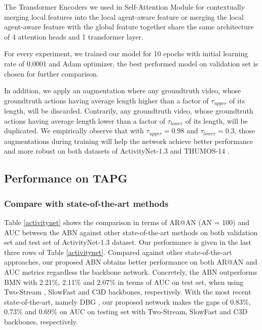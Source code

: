 \documentclass{ieeeaccess}
\begin{document}
The Transformer Encoders we used in Self-Attention Module for contextually merging local features into the local agent-aware feature or merging the local agent-aware feature with the global feature together share the same architecture of 4 attention heads and 1 transformer layer.

For every experiment, we trained our model for 10 epochs with initial learning rate of 0.0001 and Adam optimizer, the best performed model on validation set is chosen for further comparison.

In addition, we apply an augmentation where any groundtruth video, whose groundtruth actions having average length higher than a factor of $\tau_{upper}$ of its length, will be discarded. Contrarily, any groundtruth video, whose groundtruth actions having average length lower than a factor of $\tau_{lower}$ of its length, will be duplicated. We empirically observe that with $\tau_{upper}=0.98$ and $\tau_{lower}=0.3$, those augmentations during training will help the network achieve better performance and more robust on both datasets of ActivityNet-1.3 \cite{caba2015activitynet} and THUMOS-14 \cite{THUMOS14}.



\subsection{Performance on TAPG}
\subsubsection{Compare with state-of-the-art methods}

Table \ref{activitynet} shows the comparison in terms of AR@AN (AN = 100) and AUC between the ABN against other state-of-the-art methods on both validation set and test set of ActivityNet-1.3 \cite{caba2015activitynet} dataset. Our performance is given in the last three rows of Table \ref{activitynet}. Compared against other state-of-the-art approaches, our proposed ABN obtains better performance on both AR@AN and AUC metrics regardless the backbone network. Concretely, the ABN outperforms BMN with 2.21\%, 2.11\% and 2.07\% in terms of AUC on test set, when using Two-Stream \cite{2_stream_2}, SlowFast \cite{SlowFast} and C3D \cite{C3D_3} backbones, respectively. With the most recent state-of-the-art, namely DBG \cite{dbg}, our proposed network makes the gaps of 0.83\%, 0.73\% and 0.69\% on AUC on testing set with Two-Stream, SlowFast and C3D backbones, respectively.
\end{document}
